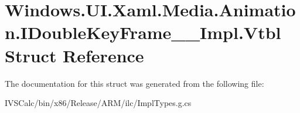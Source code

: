 \hypertarget{struct_windows_1_1_u_i_1_1_xaml_1_1_media_1_1_animation_1_1_i_double_key_frame_____impl_1_1_vtbl}{}\section{Windows.\+U\+I.\+Xaml.\+Media.\+Animation.\+I\+Double\+Key\+Frame\+\_\+\+\_\+\+Impl.\+Vtbl Struct Reference}
\label{struct_windows_1_1_u_i_1_1_xaml_1_1_media_1_1_animation_1_1_i_double_key_frame_____impl_1_1_vtbl}


The documentation for this struct was generated from the following file\+:\begin{DoxyCompactItemize}
\item 
I\+V\+S\+Calc/bin/x86/\+Release/\+A\+R\+M/ilc/Impl\+Types.\+g.\+cs\end{DoxyCompactItemize}
